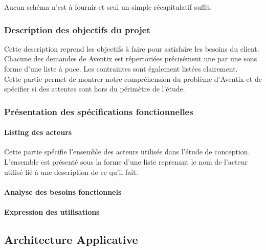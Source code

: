 Aucun schéma n'est à fournir et seul un simple récapitulatif suffit. \\

\subsubsection{Description des objectifs du projet}
Cette description reprend les objectifs à faire pour satisfaire les besoins du
client. \\

Chacune des demandes de Aventix est répertoriées précisément une par une sous
forme d'une liste à puce. Les contraintes sont également listées clairement. \\

Cette partie permet de montrer notre compréhension du problème d'Aventix et de
spécifier si des attentes sont hors du périmètre de l'étude. \\

\subsubsection{Présentation des spécifications fonctionnelles}
\paragraph{Listing des acteurs}
Cette partie spécifie l'ensemble des acteurs utilisés dans l'étude de conception. \\

L'ensemble est présenté sous la forme d'une liste reprenant le nom de l'acteur
utilisé lié à une description de ce qu'il fait. \\

\paragraph{Analyse des besoins fonctionnels}
\paragraph{Expression des utilisations}

\subsection{Architecture Applicative}


